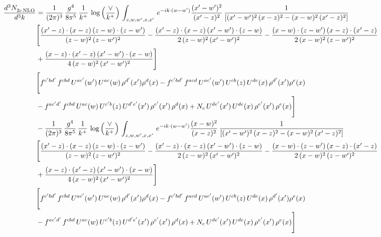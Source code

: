 \documentclass[9pt]{article}
\numberwithin{equation}{section}
\begin{document}
\begin{align}
    \frac{d^{3}N_{2c\,\rm NLO}^{\rm}}{d^{3}k}  & =  \frac{1}{(2\pi)^{3}}\, \frac{g^{4}}{8\pi^{5}}\,\frac{1}{k^{+}}\,\log{\left(\frac{\vee}{k^{+}}\right)} \,\int_{z,w,w^{\prime},x,x'}\, e^{-ik\cdot (w-w')}\frac{(x'-w')^{2}}{(x'-z)^{2}}\, \frac{1}{\left[(x'-w')^{2}\, (x-z)^{2} - (x-w)^{2}\, (x'-z)^{2}\right]} \notag \\ & \Bigg[\frac{(x'-z)\cdot (x-z)\, (z-w)\cdot (z-w')}{(z-w)^{2}\, (z-w')^{2}}-\frac{(x'-z)\cdot (x-z)\, (x'-w')\cdot (z-w)}{2\, (z-w)^{2}\, (x'-w')^{2}} -\frac{(x-w)\cdot (z-w')\, (x-z)\cdot (x'-z)}{2\, (x-w)^{2}\, (z-w')^{2}}\notag \\ & +\frac{(x-z)\cdot (x'-z)\, (x'-w')\cdot (x-w)}{4\, (x-w)^{2}\, (x'-w')^{2}}\Bigg]\notag \\ &  \Bigg[f^{c'bd'}\,f^{cbd}\, U^{ac'}(w')\,U^{ac}(w)\,\rho^{d'}(x')\rho^{d}(x)- f^{c'bd'}\,f^{acd}\,U^{ac'}(w')\,U^{cb}(z)\,U^{de}(x)\,\rho^{d'}(x')\rho^{e}(x) \notag \\ & -f^{ac'd'}\,f^{cbd}\,U^{ac}(w)\,U^{c'b}(z)\,U^{d'e'}(x')\,\rho^{e'}(x')\,\rho^{d}(x) +N_{c}\,U^{de'}(x')\,U^{de}(x)\,\rho^{e'}(x')\,\rho^{e}(x)\Bigg] \notag \\
& -\frac{1}{(2\pi)^{3}}\, \frac{g^{4}}{8\pi^{5}}\,\frac{1}{k^{+}}\,\log{\left(\frac{\vee}{k^{+}}\right)}\,\int_{z,w,w^{\prime},x,x'}\, e^{-ik\cdot (w-w')}\frac{(x-w)^{2}}{(x-z)^{2}}\, \frac{1}{\left[(x'-w')^{2}\, (x-z)^{2} - (x-w)^{2}\, (x'-z)^{2}\right]} \notag \\ & \Bigg[\frac{(x'-z)\cdot (x-z)\, (z-w)\cdot (z-w')}{(z-w)^{2}\, (z-w')^{2}}-\frac{(x'-z)\cdot (x-z)\, (x'-w')\cdot (z-w)}{2\, (z-w)^{2}\, (x'-w')^{2}} -\frac{(x-w)\cdot (z-w')\, (x-z)\cdot (x'-z)}{2\, (x-w)^{2}\, (z-w')^{2}}\notag \\ & +\frac{(x-z)\cdot (x'-z)\, (x'-w')\cdot (x-w)}{4\, (x-w)^{2}\, (x'-w')^{2}}\Bigg] \notag \\ &  \Bigg[f^{c'bd'}\,f^{cbd}\, U^{ac'}(w')\,U^{ac}(w)\,\rho^{d'}(x')\rho^{d}(x)- f^{c'bd'}\,f^{acd}\,U^{ac'}(w')\,U^{cb}(z)\,U^{de}(x)\,\rho^{d'}(x')\rho^{e}(x) \notag \\ & -f^{ac'd'}\,f^{cbd}\,U^{ac}(w)\,U^{c'b}(z)\,U^{d'e'}(x')\,\rho^{e'}(x')\,\rho^{d}(x) +N_{c}\,U^{de'}(x')\,U^{de}(x)\,\rho^{e'}(x')\,\rho^{e}(x)\Bigg]
\end{align}
\end{document}
